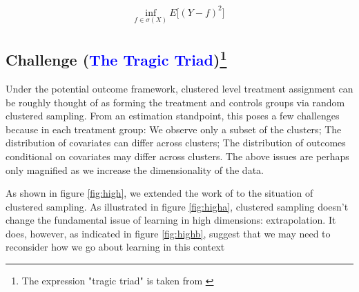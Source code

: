 \documentclass[a4paper,12pt]{article}
\begin{document}
\begin{align*}
    \underset{f \in \sigma(X)}{\text{inf}} \ E\big[(Y - f)^2\big]
\end{align*}
 

\subsection{Challenge (\textcolor{blue}{The Tragic Triad})\footnote{The expression "tragic triad" is taken from \cite{yu2020gradient}}}
Under the potential outcome framework, clustered level treatment assignment can be roughly thought of as forming the treatment and controls groups via random clustered sampling. From an estimation standpoint, this poses a few challenges because in each treatment group: We observe only a subset of the clusters; The distribution of covariates can differ across clusters; The distribution of outcomes conditional on covariates may differ across clusters. The above issues are perhaps only magnified as we increase the dimensionality of the data.\par 
As shown in figure \ref{fig:high}, we extended the work of \cite{balestriero2021learning} to the situation of clustered sampling. As illustrated in figure \ref{fig:higha}, clustered sampling doesn't change the fundamental issue of learning in high dimensions: extrapolation. It does, however, as indicated in figure \ref{fig:highb}, suggest that we may need to reconsider how we go about learning in this context
\end{document}
